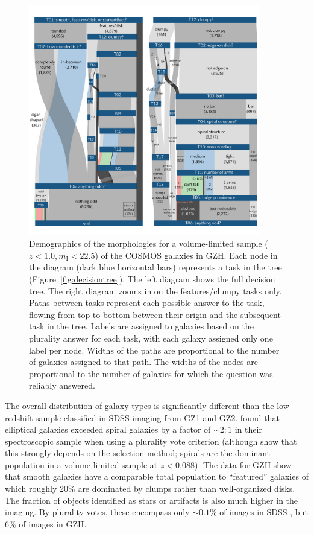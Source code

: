 \documentclass[a4paper,fleqn,usenatbib]{mnras}
\begin{document}
\begin{figure}
\center
\includegraphics[width=0.90\textwidth]{figures/sankey_cosmos.pdf}
\caption{Demographics of the morphologies for a volume-limited
sample ($z<1.0, m_\mathrm{I}<22.5$) of the COSMOS galaxies in GZH. Each node in the diagram (dark blue horizontal
bars) represents a task in the tree (Figure~\ref{fig:decisiontree}). The left diagram shows
the full decision tree. The right diagram zooms in on the features/clumpy
tasks only. Paths between tasks represent
each possible answer to the task, flowing from top to bottom between their
origin and the subsequent task in the tree. Labels are assigned to
galaxies based on the plurality answer for each task, with each galaxy assigned
only one label per node. Widths of the paths are proportional to the number
of galaxies assigned to that path. The widths of the nodes are proportional to
the number of galaxies for which the question was reliably answered.}
\label{fig:sankey}
\end{figure}

The overall distribution of galaxy types is significantly different than the
low-redshift sample classified in SDSS imaging from GZ1 and GZ2. \citet{lin11}
found that elliptical galaxies exceeded spiral galaxies by a factor of
$\sim2:1$ in their spectroscopic sample when using a plurality vote criterion
(although \citealt{bam09} show that this strongly depends on the selection
method; spirals are the dominant population in a volume-limited sample at
$z<0.088$). The data for GZH show that smooth galaxies have a comparable total
population to ``featured'' galaxies of which roughly 20\% are dominated by
clumps rather than well-organized disks.  The fraction of objects identified as
stars or artifacts is also much higher in the \hst{} imaging. By plurality
votes, these encompass only $\sim0.1\%$ of images in SDSS \citep{wil13}, but
6\% of images in GZH. 
\end{document}
